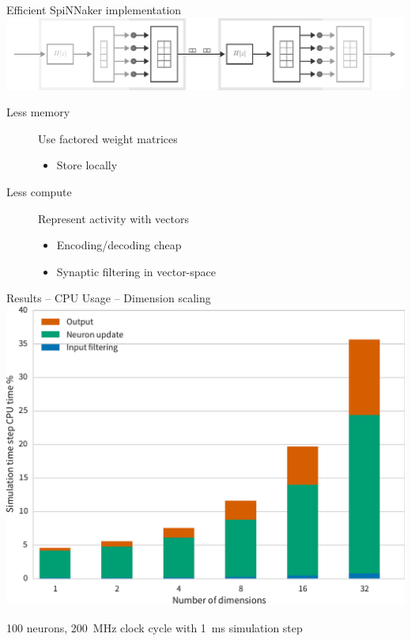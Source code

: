 \documentclass[t]{beamer}
\begin{document}
  \begin{frame}{Efficient SpiNNaker implementation}
    \includegraphics[page=1, width=\textwidth, trim=6.1cm 0 3.75cm 0, clip]
                    {figures/algorithm_diagram}

    \begin{description}
      \item[Less memory] Use factored weight matrices
        \begin{itemize}
          \item Store locally
        \end{itemize}
      \item[Less compute] Represent activity with vectors
        \begin{itemize}
          \item Encoding/decoding cheap
          \item Synaptic filtering in vector-space
        \end{itemize}
    \end{description}
  \end{frame}

  \begin{frame}[plain]{Results -- CPU Usage -- Dimension scaling}
    \includegraphics[width=\textwidth]{figures/comm_channel_cpu_100n_bar.pdf}

    {\tiny 100 neurons, \SI{200}{\mega\hertz} clock cycle with
     \SI{1}{\milli\second} simulation step}
  \end{frame}
\end{document}

